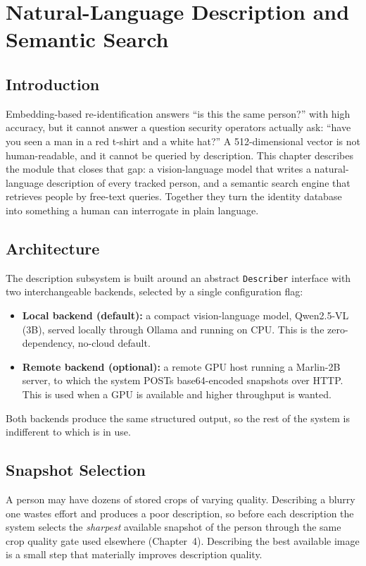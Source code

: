 \documentclass[12pt]{report}
\begin{document}
\chapter{Natural-Language Description and Semantic Search}
\setcounter{section}{0}

\section{Introduction}
Embedding-based re-identification answers ``is this the same person?'' with high accuracy, but it cannot answer a question security operators actually ask: ``have you seen a man in a red t-shirt and a white hat?'' A 512-dimensional vector is not human-readable, and it cannot be queried by description. This chapter describes the module that closes that gap: a vision-language model that writes a natural-language description of every tracked person, and a semantic search engine that retrieves people by free-text queries. Together they turn the identity database into something a human can interrogate in plain language.

\section{Architecture}
The description subsystem is built around an abstract \texttt{Describer} interface with two interchangeable backends, selected by a single configuration flag:
\begin{itemize}
    \item \textbf{Local backend (default):} a compact vision-language model, Qwen2.5-VL (3B), served locally through Ollama and running on CPU. This is the zero-dependency, no-cloud default.
    \item \textbf{Remote backend (optional):} a remote GPU host running a Marlin-2B server, to which the system POSTs base64-encoded snapshots over HTTP. This is used when a GPU is available and higher throughput is wanted.
\end{itemize}
Both backends produce the same structured output, so the rest of the system is indifferent to which is in use.

\section{Snapshot Selection}
A person may have dozens of stored crops of varying quality. Describing a blurry one wastes effort and produces a poor description, so before each description the system selects the \emph{sharpest} available snapshot of the person through the same crop quality gate used elsewhere (Chapter~4). Describing the best available image is a small step that materially improves description quality.
\end{document}
